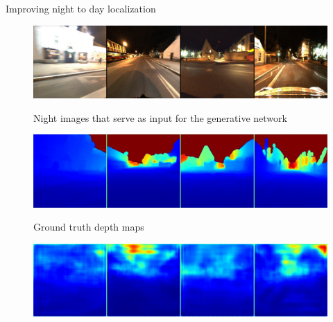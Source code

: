 \begin{frame}{Improving night to day localization}
\begin{minipage}{0.7\linewidth}
	\centering
	
	\begin{figure}
		\centering
		\begin{minipage}{0.74\linewidth}
			\includegraphics[width=\linewidth]{im/res/night_input}
		\end{minipage}
		\begin{minipage}{0.21\linewidth}
			\raggedright \footnotesize
			Night images that serve as input for the generative network
		\end{minipage}
	\end{figure}
	\vspace{-0.5cm}
	\begin{figure}
		\centering
		\begin{minipage}{0.74\linewidth}
			\includegraphics[width=\linewidth]{im/res/night_gt}
		\end{minipage}
		\begin{minipage}{0.21\linewidth}
			\raggedright \footnotesize
			Ground truth depth maps
		\end{minipage}
	\end{figure}	
	\vspace{-0.5cm}
	\begin{figure}
		\centering
		\begin{minipage}{0.74\linewidth}
			\includegraphics[width=\linewidth]{im/res/night_noft}

\end{minipage}
\end{figure}
\end{minipage}
\end{frame}
